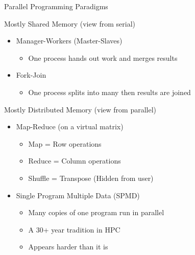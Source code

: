 \begin{frame}{Parallel Programming Paradigms}
  \begin{block}{Mostly Shared Memory (view from serial)}
    \begin{itemize}
    \item Manager-Workers (Master-Slaves)
      \begin{itemize}
      \item One process hands out work and merges results
      \end{itemize}
    \item Fork-Join
      \begin{itemize}
      \item One process splits into many then results are joined
      \end{itemize}
    \end{itemize}
  \end{block}
  \begin{block}{Mostly Distributed Memory (view from parallel)}
    \begin{itemize}
    \item Map-Reduce (on a virtual matrix)
      \begin{itemize}
      \item Map = Row operations
      \item Reduce = Column operations
      \item Shuffle = Transpose (Hidden from user)
      \end{itemize}
    \item Single Program Multiple Data (SPMD)
      \begin{itemize}
      \item Many copies of one program run in parallel
      \item A 30+ year tradition in HPC
      \item Appears harder than it is
      \end{itemize}
    \end{itemize}
  \end{block}
\end{frame}


